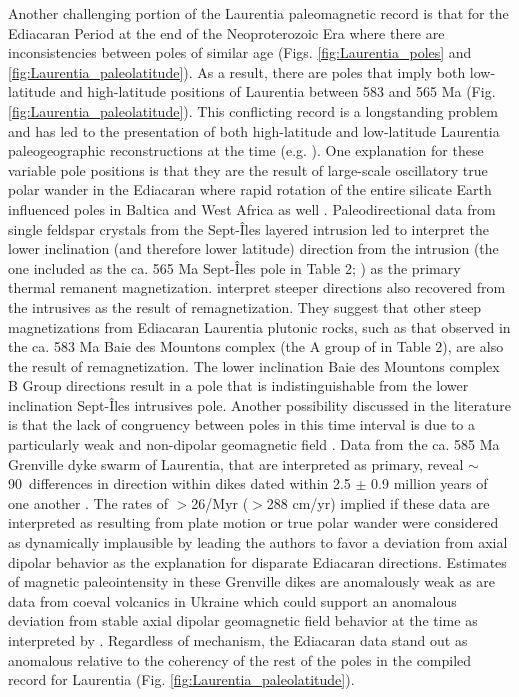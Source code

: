 \documentclass[twocolumn, switch]{article} %
\begin{document}
Another challenging portion of the Laurentia paleomagnetic record is that for the Ediacaran Period at the end of the Neoproterozoic Era where there are inconsistencies between poles of similar age (Figs. \ref{fig:Laurentia_poles} and \ref{fig:Laurentia_paleolatitude}). As a result, there are poles that imply both low-latitude and high-latitude positions of Laurentia between 583 and 565 Ma (Fig. \ref{fig:Laurentia_paleolatitude}). This conflicting record is a longstanding problem and has led to the presentation of both high-latitude and low-latitude Laurentia paleogeographic reconstructions at the time (e.g. \citealp{Pisarevsky2001a,Li2008a}). One explanation for these variable pole positions is that they are the result of large-scale oscillatory true polar wander in the Ediacaran where rapid rotation of the entire silicate Earth influenced poles in Baltica and West Africa as well \citep{McCausland2007a, Robert2017a}. Paleodirectional data from single feldspar crystals from the Sept-\^Iles layered intrusion led \cite{Bono2015a} to interpret the lower inclination (and therefore lower latitude) direction from the intrusion (the one included as the ca. 565 Ma Sept-\^Iles pole in Table 2; \citealp{Tanczyk1987a}) as the primary thermal remanent magnetization.  \cite{Bono2015a} interpret steeper directions also recovered from the intrusives as the result of remagnetization. They suggest that other steep magnetizations from Ediacaran Laurentia plutonic rocks, such as that observed in the ca. 583 Ma Baie des Mountons complex (the A group of \cite{McCausland2011a} in Table 2), are also the result of remagnetization. The lower inclination Baie des Mountons complex B Group directions result in a pole that is indistinguishable from the lower inclination  Sept-\^Iles intrusives pole. Another possibility discussed in the literature is that the lack of congruency between poles in this time interval is due to a particularly weak and non-dipolar geomagnetic field \citep{Abrajevitch2010a, Halls2015a, Bono2019a}. Data from the ca. 585 Ma Grenville dyke swarm of Laurentia, that are interpreted as primary, reveal $\sim$90\textdegree\ differences in direction within dikes dated within 2.5 $\pm$ 0.9 million years of one another \citep{Halls2015a}. The rates of $>$26\textdegree /Myr ($>$288 cm/yr) implied if these data are interpreted as resulting from plate motion or true polar wander were considered as dynamically implausible by \cite{Halls2015a} leading the authors to favor a deviation from axial dipolar behavior as the explanation for disparate Ediacaran directions. Estimates of magnetic paleointensity in these Grenville dikes are anomalously weak \citep{Thallner2020a} as are data from coeval volcanics in Ukraine \citep{Shcherbakova2019a} which could support an anomalous deviation from stable axial dipolar geomagnetic field behavior at the time as interpreted by \cite{Halls2015a}.  Regardless of mechanism, the Ediacaran data stand out as anomalous relative to the coherency of the rest of the poles in the compiled record for Laurentia (Fig. \ref{fig:Laurentia_paleolatitude}). 
\end{document}
